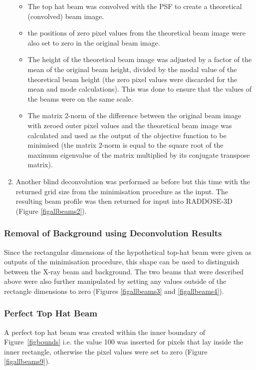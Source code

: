 \begin{enumerate}
\begin{itemize}
\item The top hat beam was convolved with the PSF to create a theoretical (convolved) beam image.
\item the positions of zero pixel values from the theoretical beam image were also set to zero in the original beam image.
\item The height of the theoretical beam image was adjusted by a factor of the mean of the original beam height, divided by the modal value of the theoretical beam height (the zero pixel values were discarded for the mean and mode calculations).
This was done to ensure that the values of the beams were on the same scale.
\item The matrix 2-norm of the difference between the original beam image with zeroed outer pixel values and the theoretical beam image was calculated and used as the output of the objective function to be minimised (the matrix 2-norm is equal to the square root of the maximum eigenvalue of the matrix multiplied by its conjugate transpose matrix).
\end{itemize}
\item Another blind deconvolution was performed as before but this time with the returned grid size from the minimisation procedure as the input.
The resulting beam profile was then returned for input into RADDOSE-3D (Figure \ref{figallbeams2}).
\end{enumerate}

\subsubsection{Removal of Background using Deconvolution Results}
Since the rectangular dimensions of the hypothetical top-hat beam were given as outputs of the minimisation procedure, this shape can be used to distinguish between the X-ray beam and background.
The two beams that were described above were also further manipulated by setting any values outside of the rectangle dimensions to zero (Figures \ref{figallbeams3} and \ref{figallbeams4}).

\subsubsection{Perfect Top Hat Beam}
A perfect top hat beam was created within the inner boundary of Figure~\ref{figbounds}  i.e. the value 100 was inserted for pixels that lay inside the inner rectangle, otherwise the pixel values were set to zero (Figure \ref{figallbeams9}).

